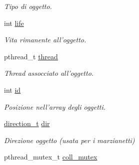 \begin{DoxyCompactItemize}
\begin{DoxyCompactList}\small\item\em Tipo di oggetto. \item\end{DoxyCompactList}\item 
\hypertarget{structobject__data__t_af1092c54c97d271905181362ea8cbd78}{
int \hyperlink{structobject__data__t_af1092c54c97d271905181362ea8cbd78}{life}}
\label{structobject__data__t_af1092c54c97d271905181362ea8cbd78}

\begin{DoxyCompactList}\small\item\em Vita rimanente all'oggetto. \item\end{DoxyCompactList}\item 
\hypertarget{structobject__data__t_a6c6b186783495caa2f28058c07841af1}{
pthread\_\-t \hyperlink{structobject__data__t_a6c6b186783495caa2f28058c07841af1}{thread}}
\label{structobject__data__t_a6c6b186783495caa2f28058c07841af1}

\begin{DoxyCompactList}\small\item\em Thread assocciato all'oggetto. \item\end{DoxyCompactList}\item 
\hypertarget{structobject__data__t_a0b947c14da562c8ba31ff276caa8a765}{
int \hyperlink{structobject__data__t_a0b947c14da562c8ba31ff276caa8a765}{id}}
\label{structobject__data__t_a0b947c14da562c8ba31ff276caa8a765}

\begin{DoxyCompactList}\small\item\em Posizione nell'array degli oggetti. \item\end{DoxyCompactList}\item 
\hypertarget{structobject__data__t_aabe25702b6a6537183f4b06898e95dfa}{
\hyperlink{space__invaders_8h_ae9ae980041e438eed7a3af43ce4e9f6b}{direction\_\-t} \hyperlink{structobject__data__t_aabe25702b6a6537183f4b06898e95dfa}{dir}}
\label{structobject__data__t_aabe25702b6a6537183f4b06898e95dfa}

\begin{DoxyCompactList}\small\item\em Direzione oggetto (usata per i marzianetti) \item\end{DoxyCompactList}\item 
\hypertarget{structobject__data__t_a1842403cb0d8d608eb397152e23da75c}{
pthread\_\-mutex\_\-t \hyperlink{structobject__data__t_a1842403cb0d8d608eb397152e23da75c}{coll\_\-mutex}}
\label{structobject__data__t_a1842403cb0d8d608eb397152e23da75c}


\end{DoxyCompactItemize}
